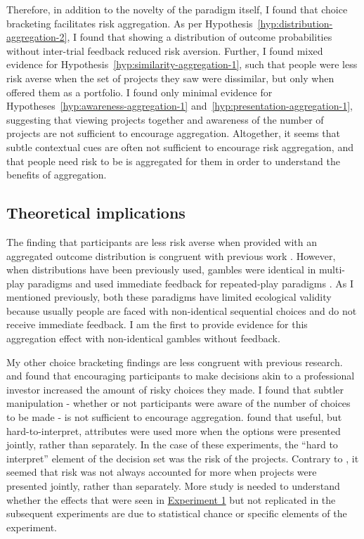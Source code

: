 \documentclass[a4paper, nobind, dvipsnames]{templates/ociamthesis}
\theoremstyle{definition}
\theoremstyle{definition}
\theoremstyle{definition}
\theoremstyle{definition}
\theoremstyle{remark}
\begin{document}
Therefore, in addition to the novelty of the paradigm itself, I found that
choice bracketing facilitates risk aggregation. As per
Hypothesis~\ref{hyp:distribution-aggregation-2}, I found that showing a
distribution of outcome probabilities without inter-trial feedback reduced risk
aversion. Further, I found mixed evidence for
Hypothesis~\ref{hyp:similarity-aggregation-1}, such that people were less risk
averse when the set of projects they saw were dissimilar, but only when offered
them as a portfolio. I found only minimal evidence for
Hypotheses~\ref{hyp:awareness-aggregation-1}
and~\ref{hyp:presentation-aggregation-1}, suggesting that viewing projects
together and awareness of the number of projects are not sufficient to encourage
aggregation. Altogether, it seems that subtle contextual cues are often not
sufficient to encourage risk aggregation, and that people need risk to be is
aggregated for them in order to understand the benefits of aggregation.

\subsection{Theoretical implications}

The finding that participants are less risk averse when provided with an
aggregated outcome distribution is congruent with previous work \autocite[e.g.,][]{redelmeier1992}. However, when distributions have been previously used,
gambles were identical in multi-play paradigms and used immediate feedback for
repeated-play paradigms \autocite[e.g.,][]{benartzi1999}. As I mentioned previously, both
these paradigms have limited ecological validity because usually people are
faced with non-identical sequential choices and do not receive immediate
feedback. I am the first to provide evidence for this aggregation effect with
non-identical gambles without feedback.

My other choice bracketing findings are less congruent with previous research.
\textcite{sokolhessner2009} and \textcite{sokolhessner2012} found that encouraging participants to
make decisions akin to a professional investor increased the amount of risky
choices they made. I found that subtler manipulation - whether or not
participants were aware of the number of choices to be made - is not sufficient
to encourage aggregation. \textcite{hsee1999} found that useful, but hard-to-interpret,
attributes were used more when the options were presented jointly, rather than
separately. In the case of these experiments, the ``hard to interpret'' element of
the decision set was the risk of the projects. Contrary to \textcite{hsee1999}, it seemed
that risk was not always accounted for more when projects were presented
jointly, rather than separately. More study is needed to understand whether the
effects that were seen in \protect\hyperlink{results-aggregation-1}{Experiment 1} but not
replicated in the subsequent experiments are due to statistical chance or
specific elements of the experiment.
\end{document}
